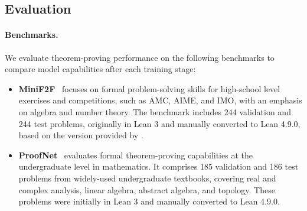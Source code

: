\subsection{Evaluation} \label{sec:sft-eval}

\paragraph{Benchmarks.}
We evaluate theorem-proving performance on the following benchmarks to compare model capabilities after each training stage:
\begin{itemize}
    \item \textbf{MiniF2F}~\citep{zheng2021minif2f} focuses on formal problem-solving skills for high-school level exercises and competitions, such as AMC, AIME, and IMO, with an emphasis on algebra and number theory. The benchmark includes 244 validation and 244 test problems, originally in Lean 3 and manually converted to Lean 4.9.0, based on the version provided by \citet{minif2f_solution}.
    \item \textbf{ProofNet}~\citep{azerbayev2023proofnet} evaluates formal theorem-proving capabilities at the undergraduate level in mathematics. It comprises 185 validation and 186 test problems from widely-used undergraduate textbooks, covering real and complex analysis, linear algebra, abstract algebra, and topology. These problems were initially in Lean 3 and manually converted to Lean 4.9.0.
\end{itemize}

